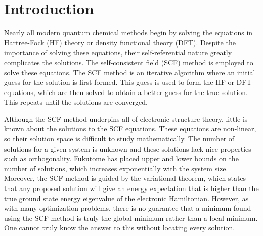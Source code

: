 \documentclass[final,3p,times,twocolumn]{elsarticle}
\begin{document}
\section{Introduction} \label{sec:intro}
Nearly all modern quantum chemical methods begin by solving the equations in Hartree-Fock (HF) theory\cite{hartree,fock,slater} or density functional theory (DFT).\cite{dft1,dft2} Despite the importance of solving these equations, their self-referential nature greatly complicates the solutions. The self-consistent field (SCF) method is employed to solve these equations.\cite{hartree,szabo,scf} The SCF method is an iterative algorithm where an initial guess for the solution is first formed. This guess is used to form the HF or DFT equations, which are then solved to obtain a better guess for the true solution. This repeats until the solutions are converged.


Although the SCF method underpins all of electronic structure theory, little is known about the solutions to the SCF equations. These equations are non-linear, so their solution space is difficult to study mathematically. The number of solutions for a given system is unknown and these solutions lack nice properties such as orthogonality.\cite{scfmd} Fukutome has placed upper and lower bounds on the number of solutions, which increases exponentially with the system size.\cite{fukutome-1971} Moreover, the SCF method is guided by the variational theorem, which states that any proposed solution will give an energy expectation that is higher than the true ground state energy eigenvalue of the electronic Hamiltonian. However, as with many optimization problems, there is no guarantee that a minimum found using the SCF method is truly the global minimum rather than a local minimum. One cannot truly know the answer to this without locating every solution. %
\end{document}
